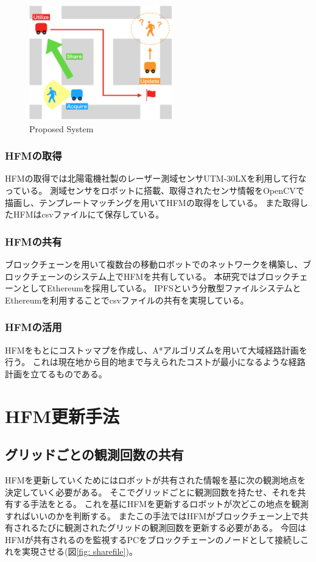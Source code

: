\documentclass{jsarticle}
\begin{document}
\begin{figure}[tbh]
 \centering
  \includegraphics[height=50mm]{fig/proposedsystem.eps}
  \vspace*{-4mm}
  \caption{Proposed System}
  \label{fig: proposedsystem}
\end{figure}

\subsubsection{HFMの取得}
HFMの取得では北陽電機社製のレーザー測域センサUTM-30LXを利用して行なっている。
測域センサをロボットに搭載、取得されたセンサ情報をOpenCVで描画し、テンプレートマッチングを用いてHFMの取得をしている。
また取得したHFMはcsvファイルにて保存している。

\subsubsection{HFMの共有}
ブロックチェーンを用いて複数台の移動ロボットでのネットワークを構築し、ブロックチェーンのシステム上でHFMを共有している。
本研究ではブロックチェーンとしてEthereumを採用している。
IPFSという分散型ファイルシステムとEthereumを利用することでcsvファイルの共有を実現している。


\subsubsection{HFMの活用}
HFMをもとにコストッマプを作成し、A*アルゴリズムを用いて大域経路計画を行う。
これは現在地から目的地まで与えられたコストが最小になるような経路計画を立てるものである。



\section{HFM更新手法}
\subsection{グリッドごとの観測回数の共有}
HFMを更新していくためにはロボットが共有された情報を基に次の観測地点を決定していく必要がある。
そこでグリッドごとに観測回数を持たせ、それを共有する手法をとる。
これを基にHFMを更新するロボットが次どこの地点を観測すればいいのかを判断する。
またこの手法ではHFMがブロックチェーン上で共有されるたびに観測されたグリッドの観測回数を更新する必要がある。
今回はHFMが共有されるのを監視するPCをブロックチェーンのノードとして接続しこれを実現させる(図\ref{fig: sharefile})。
\end{document}
